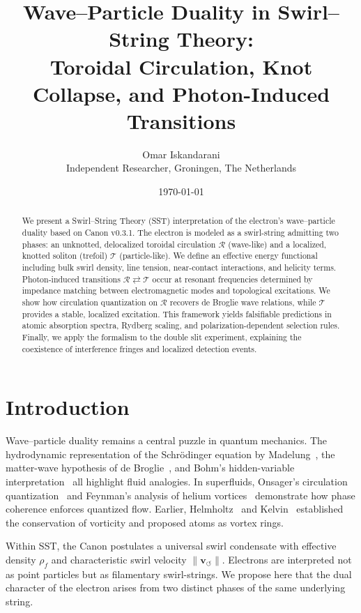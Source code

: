 \documentclass[11pt,a4paper]{article}
\title{Wave--Particle Duality in Swirl--String Theory: \\
Toroidal Circulation, Knot Collapse, and Photon-Induced Transitions}
\author{Omar Iskandarani \\ Independent Researcher, Groningen, The Netherlands}
\date{\today}
\begin{document}
\maketitle

\begin{abstract}
We present a Swirl--String Theory (SST) interpretation of the electron’s
wave--particle duality based on Canon v0.3.1.
The electron is modeled as a swirl-string admitting two phases:
an unknotted, delocalized toroidal circulation $\mathcal R$
(wave-like) and a localized, knotted soliton (trefoil) $\mathcal T$ (particle-like).
We define an effective energy functional including bulk swirl density, line tension,
near-contact interactions, and helicity terms.
Photon-induced transitions $\mathcal R \rightleftarrows \mathcal T$ occur at resonant
frequencies determined by impedance matching between electromagnetic modes
and topological excitations.
We show how circulation quantization on $\mathcal R$ recovers
de Broglie wave relations, while $\mathcal T$ provides a stable, localized excitation.
This framework yields falsifiable predictions in atomic absorption spectra,
Rydberg scaling, and polarization-dependent selection rules.
Finally, we apply the formalism to the double slit experiment, explaining
the coexistence of interference fringes and localized detection events.
\end{abstract}

\section{Introduction}

    Wave--particle duality remains a central puzzle in quantum mechanics.
    The hydrodynamic representation of the Schrödinger equation
    by Madelung~\cite{Madelung1927}, the matter-wave hypothesis of de Broglie~\cite{deBroglie1925},
    and Bohm’s hidden-variable interpretation~\cite{Bohm1952a,Bohm1952b}
    all highlight fluid analogies.
    In superfluids, Onsager’s circulation quantization~\cite{Onsager1949}
    and Feynman’s analysis of helium vortices~\cite{Feynman1955}
    demonstrate how phase coherence enforces quantized flow.
    Earlier, Helmholtz~\cite{Helmholtz1858} and Kelvin~\cite{Kelvin1869}
    established the conservation of vorticity and proposed atoms as vortex rings.

    Within SST, the Canon postulates a universal swirl condensate with
    effective density $\rho_f$ and characteristic swirl velocity $\|\mathbf v_{\circlearrowleft}\|$.
    Electrons are interpreted not as point particles but as filamentary swirl-strings.
    We propose here that the dual character of the electron
    arises from two distinct phases of the same underlying string.
\end{document}
